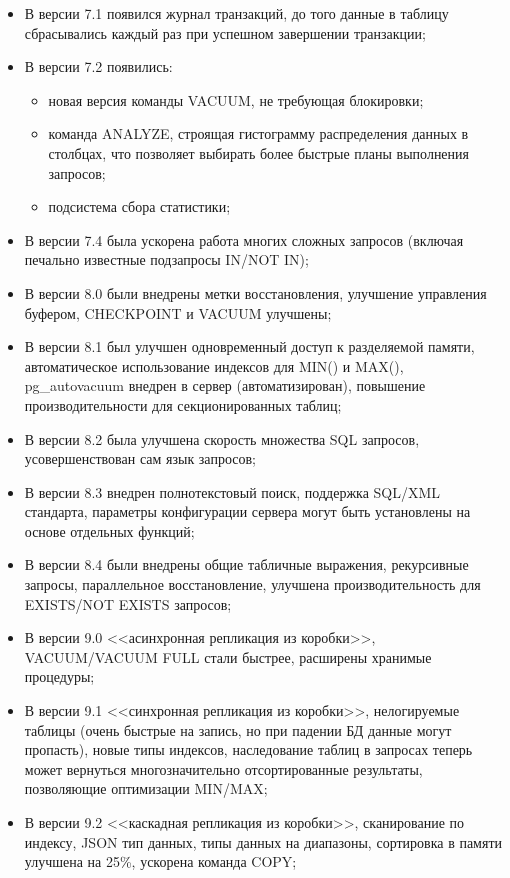 \begin{itemize}
  \item В версии 7.1 появился журнал транзакций, до того данные в таблицу сбрасывались каждый раз при успешном завершении транзакции;
  \item В версии 7.2 появились:
  \begin{itemize}
    \item новая версия команды VACUUM, не требующая блокировки;
    \item команда ANALYZE, строящая гистограмму распределения данных в столбцах, что позволяет выбирать более быстрые планы выполнения запросов;
    \item подсистема сбора статистики;
  \end{itemize}
  \item В версии 7.4 была ускорена работа многих сложных запросов (включая печально известные подзапросы IN/NOT IN);
  \item В версии 8.0 были внедрены метки восстановления, улучшение управления буфером, CHECKPOINT и VACUUM улучшены;
  \item В версии 8.1 был улучшен одновременный доступ к разделяемой памяти, автоматическое использование индексов для MIN() и MAX(), pg\_autovacuum внедрен в сервер (автоматизирован), повышение производительности для секционированных таблиц;
  \item В версии 8.2 была улучшена скорость множества SQL запросов, усовершенствован сам язык запросов;
  \item В версии 8.3 внедрен полнотекстовый поиск, поддержка SQL/XML стандарта, параметры конфигурации сервера могут быть установлены на основе отдельных функций;
  \item В версии 8.4 были внедрены общие табличные выражения, рекурсивные запросы, параллельное восстановление, улучшена производительность для EXISTS/NOT EXISTS запросов;
  \item В версии 9.0 <<асинхронная репликация из коробки>>, VACUUM/VACUUM FULL стали быстрее, расширены хранимые процедуры;
  \item В версии 9.1 <<синхронная репликация из коробки>>, нелогируемые таблицы (очень быстрые на запись, но при падении БД данные могут пропасть), новые типы индексов, наследование таблиц в запросах теперь может вернуться многозначительно отсортированные результаты, позволяющие оптимизации MIN/MAX;
  \item В версии 9.2 <<каскадная репликация из коробки>>, сканирование по индексу, JSON тип данных, типы данных на диапазоны, сортировка в памяти улучшена на 25\%, ускорена команда COPY;

\end{itemize}
